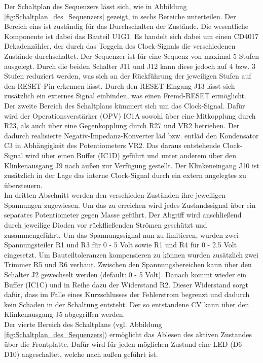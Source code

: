 Der Schaltplan des Sequenzers lässt sich, wie in Abbildung \ref{fig:Schaltplan_des_Sequenzers} gezeigt, in sechs Bereiche unterteilen. Der Bereich eins ist zuständig für das Durchschalten der Zustände.
Die wesentliche Komponente ist dabei das Bauteil U1G1. Es handelt sich dabei um einen CD4017 Dekadenzähler, der durch das Toggeln des Clock-Signals die verschiedenen Zustände durchschaltet. Der Sequenzer ist für eine Sequenz von maximal 5 Stufen ausgelegt. Durch die beiden Schalter J11 und J12 kann diese jedoch auf 4 bzw. 3 Stufen reduziert werden, was sich an der Rückführung der jeweiligen Stufen auf den RESET-Pin erkennen lässt. Durch den RESET-Eingang J13 lässt sich zusätzlich ein externes Signal einbinden, was einen Fremd-RESET ermöglicht.\\
Der zweite Bereich des Schaltplans kümmert sich um das Clock-Signal. Dafür wird der Operationsverstärker (OPV) IC1A sowohl über eine Mitkopplung durch R23, als auch über eine Gegenkopplung durch R27 und VR2 betrieben. Der dadurch realisierte Negativ-Impedanz-Konverter läd bzw. entläd den Kondensator C3 in Abhängigkeit des Potentiometers VR2. Das daraus entstehende Clock-Signal wird über einen Buffer (IC1D) geführt und unter anderem über den Klinkenausgang J9 nach außen zur Verfügung gestellt. Der Klinkeneingang J10 ist zusätzlich in der Lage das interne Clock-Signal durch ein extern angelegtes zu übersteuern.\\
Im dritten Abschnitt werden den verschieden Zuständen ihre jeweiligen Spannungen zugewiesen. Um das zu erreichen wird jedes Zustandssignal über ein separates Potentiometer gegen Masse geführt. Der Abgriff wird anschließend durch jeweilige Dioden vor rückfließenden Strömen geschützt und zusammengeführt. Um das Spannungssignal nun zu limitieren, wurden zwei Spannungsteiler R1 und R3 für 0 - 5 Volt sowie R1 und R4 für 0 - 2.5 Volt eingesetzt. Um Bauteiltoleranzen kompensieren zu können wurden zusätzlich zwei Trimmer R5 und R6 verbaut. Zwischen den Spannungsbereichen kann über den Schalter J2 gewechselt werden (default: 0 - 5 Volt). Danach kommt wieder ein Buffer (IC1C) und in Reihe dazu der Widerstand R2. Dieser Widerstand sorgt dafür, dass im Falle eines Kurzschlusses der Fehlerstrom begrenzt und dadurch kein Schaden in der Schaltung entsteht. Der so entstandene CV kann über den Klinkenausgang J5 abgegriffen werden.\\
Der vierte Bereich des Schaltplans (vgl. Abbildung \ref{fig:Schaltplan_des_Sequenzers}) ermöglicht das Ablesen des aktiven Zustandes über die Frontplatte. 
Dafür wird für jeden möglichen Zustand eine LED (D6 - D10) angeschaltet, welche nach außen geführt ist. 
